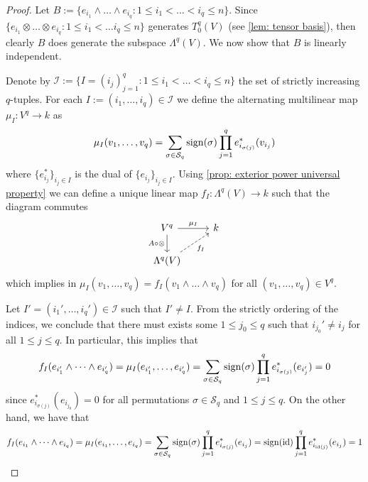 \begin{proof}
  Let \(B := \{e_{i_1} \wedge \dots \wedge e_{i_q} : 1 \leq i_1 < \dots < i_q
  \leq n\}\). Since \(\{e_{i_1} \otimes \dots \otimes e_{i_q} : 1 \leq i_1 <
  \dots i_q \leq n\}\) generates \(T_0^q(V)\) (see \cref{lem: tensor basis}),
  then clearly \(B\) does generate the subspace \(\Lambda^q(V)\). We now show
  that \(B\) is linearly independent.

  Denote by \(\mathcal I := \{I = (i_j)_{j=1}^q : 1 \leq i_1 < \dots < i_q \leq
  n\}\) the set of strictly increasing \(q\)-tuples. For each \(I := (i_1,
  \dots, i_q) \in \mathcal I\) we define the alternating multilinear map \(\mu_I
  : V^q \to k\) as
  \[
    \mu_I(v_1, \dots, v_q) = \sum_{\sigma \in \mathcal S_q}
    \operatorname{sign}(\sigma) \prod_{j=1}^q e_{i_{\sigma(j)}}^*(v_{i_j})
  \] 
  where \(\{e_{i_j}^*\}_{i_j \in I}\) is the dual of \(\{e_{i_j}\}_{i_j
  \in I}\). Using \cref{prop: exterior power universal property} we can
  define a unique linear map \(f_I: \Lambda^q(V) \to k\) such that the diagram
  commutes
  \[
    \begin{tikzcd}
      V^q \ar[r, "\mu_I"] \ar[d, swap, "A \circ \otimes"] &k \\
      \Lambda^q(V) \ar[ur, dashed, swap, "f_I"]
    \end{tikzcd}
  \] 
  which implies in \(\mu_I(v_1, \dots, v_q) = f_I(v_1 \wedge \dots \wedge v_q)\)
  for all \((v_1, \dots, v_q) \in V^q\).

  Let \(I' = (i_1', \dots, i_q') \in \mathcal I\) such that \(I' \neq I\). From
  the strictly ordering of the indices, we conclude that there must exists some
  \(1 \leq j_0 \leq q\) such that \(i_{j_0}' \neq i_j\) for all \(1 \leq j \leq
  q\). In particular, this implies that
  \[
    f_I(e_{i_1'} \wedge \dots \wedge e_{i_q'}) = \mu_I(e_{i_1'}, \dots,
    e_{i_q'}) = \sum_{\sigma \in \mathcal S_q} \operatorname{sign}(\sigma)
    \prod_{j=1}^q e_{i_{\sigma(j)}}^*(e_{i_j'}) = 0
  \] 
  since \(e_{i_{\sigma(j)}}^*(e_{i_{j_0}}) = 0\) for all permutations \(\sigma
  \in \mathcal S_q\) and \(1 \leq j \leq q\). On the other hand, we have that
  \[
    f_I(e_{i_1} \wedge \dots \wedge e_{i_q}) = \mu_I(e_{i_1}, \dots, e_{i_q})
    = \sum_{\sigma \in \mathcal S_q} \operatorname{sign}(\sigma) \prod_{j=1}^q
    e_{i_{\sigma(j)}}^*(e_{i_j})
    = \operatorname{sign}(\operatorname{id}) \prod_{j=1}^q e_{i_{\operatorname{id}(j)}}^*(e_{i_j})
    = 1
  \] 


\end{proof}
